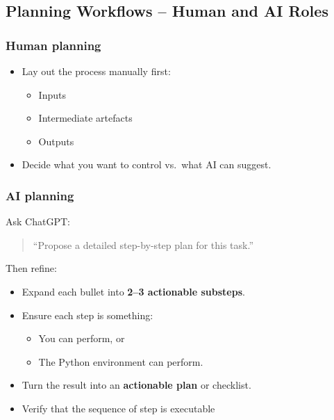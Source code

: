 \documentclass[
  letterpaper,
  DIV=11,
  numbers=noendperiod]{scrreprt}
\providecommand{\tightlist}{%
  \setlength{\itemsep}{0pt}\setlength{\parskip}{0pt}}
\begin{document}
\subsection{Planning Workflows -- Human and AI
Roles}\label{planning-workflows-human-and-ai-roles}

\subsubsection{Human planning}\label{human-planning}

\begin{itemize}
\tightlist
\item
  Lay out the process manually first:

  \begin{itemize}
  \tightlist
  \item
    Inputs
  \item
    Intermediate artefacts
  \item
    Outputs
  \end{itemize}
\item
  Decide what you want to control vs.~what AI can suggest.
\end{itemize}

\subsubsection{AI planning}\label{ai-planning}

Ask ChatGPT:

\begin{quote}
``Propose a detailed step-by-step plan for this task.''
\end{quote}

Then refine:

\begin{itemize}
\item
  Expand each bullet into \textbf{2--3 actionable substeps}.
\item
  Ensure each step is something:

  \begin{itemize}
  \tightlist
  \item
    You can perform, or
  \item
    The Python environment can perform.
  \end{itemize}
\item
  Turn the result into an \textbf{actionable plan} or checklist.
\item
  Verify that the sequence of step is executable
\end{itemize}
\end{document}
